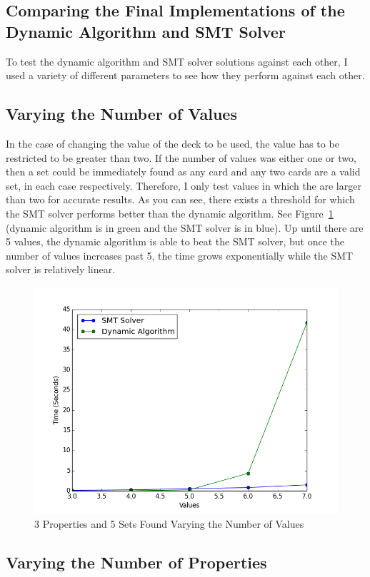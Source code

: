 \documentclass[pageno]{jpaper}
\begin{document}
\subsection{Comparing the Final Implementations of the Dynamic Algorithm and SMT Solver}

To test the dynamic algorithm and SMT solver solutions against each other, I used a variety of different parameters to see how they perform against each other. 

\subsection{Varying the Number of Values}

In the case of changing the value of the deck to be used, the value has to be restricted to be greater than two. If the number of values was either one or two, then a set could be immediately found as any card and any two cards are a valid set, in each case respectively. Therefore, I only test values in which the are larger than two for accurate results. As you can see, there exists a threshold for which the SMT solver performs better than the dynamic algorithm. See Figure~\ref{fig:DvSVAL} (dynamic algorithm is in green and the SMT solver is in blue). Up until there are 5 values, the dynamic algorithm is able to beat the SMT solver, but once the number of values increases past 5, the time grows exponentially while the SMT solver is relatively linear. 


\begin{figure}[htbb]

\centering
\includegraphics[width=.5\linewidth]{DvSVAL-v34567p3n5.png}
\caption{3 Properties and 5 Sets Found Varying the Number of Values}
\label{fig:DvSVAL}

\end{figure}


\subsection{Varying the Number of Properties}
\end{document}
